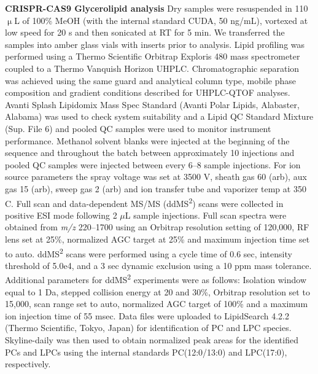 \documentclass[9pt,twocolumn,twoside,lineno]{biorxiv}
\begin{document}
\textbf{CRISPR-CAS9 Glycerolipid analysis}
Dry samples were resuspended in 110 $\upmu$L of 100\% MeOH (with the internal standard CUDA, 50 ng/mL), vortexed at low speed for 20 s and then sonicated at RT for 5 min. 
We transferred the samples into amber glass vials with inserts prior to analysis. 
Lipid profiling was performed using a Thermo Scientific Orbitrap Exploris 480 mass spectrometer coupled to a Thermo Vanquish Horizon UHPLC. 
Chromatographic separation was achieved using the same guard and analytical column type, mobile phase composition and gradient conditions described for UHPLC-QTOF analyses. 
Avanti Splash Lipidomix Mass Spec Standard (Avanti Polar Lipids, Alabaster, Alabama) was used to check system suitability and a Lipid QC Standard Mixture (Sup. File 6) and pooled QC samples were used to monitor instrument performance. 
Methanol solvent blanks were injected at the beginning of the sequence and throughout the batch between approximately 10 injections and pooled QC samples were injected between every 6–8 sample injections. 
For ion source parameters the spray voltage was set at 3500 V, sheath gas 60 (arb), aux gas 15 (arb), sweep gas 2 (arb) and ion transfer tube and vaporizer temp at 350 \degree C. 
Full scan and data-dependent MS/MS (ddMS\textsuperscript{2}) scans were collected in positive ESI mode following 2 $\mu$L sample injections. 
Full scan spectra were obtained from \textit{m/z} 220--1700 using an Orbitrap resolution setting of 120,000, RF lens set at 25\%, normalized AGC target at 25\% and maximum injection time set to auto. 
ddMS\textsuperscript{2} scans were performed using a cycle time of 0.6 sec, intensity threshold of 5.0e4, and a 3 sec dynamic exclusion using a 10 ppm mass tolerance. 
Additional parameters for ddMS\textsuperscript{2} experiments were as follows: Isolation window equal to 1 Da, stepped collision energy at 20 and 30\%, Orbitrap resolution set to 15,000, scan range set to auto, normalized AGC target of 100\% and a maximum ion injection time of 55 msec. 
Data files were uploaded to LipidSearch 4.2.2 (Thermo Scientific, Tokyo, Japan) for identification of PC and LPC species. 
Skyline-daily \cite{Adams2020-em} was then used to obtain normalized peak areas for the identified PCs and LPCs using the internal standards PC(12:0/13:0) and LPC(17:0), respectively.
\end{document}
